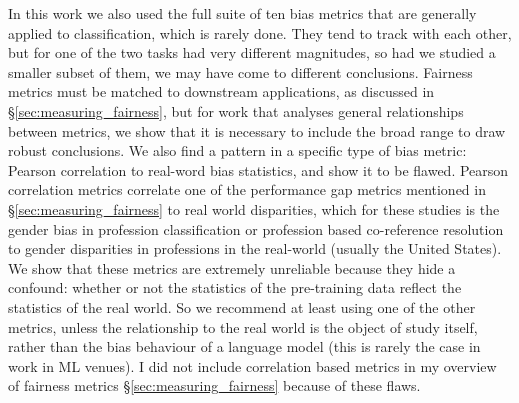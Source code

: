 In this work we also used the full suite of ten bias metrics that are generally applied to classification, which is rarely done. They tend to track with each other, but for one of the two tasks had very different magnitudes, so had we studied a smaller subset of them, we may have come to different conclusions. Fairness metrics must be matched to downstream applications, as discussed in \S \ref{sec:measuring_fairness}, but for work that analyses general relationships between metrics, we show that it is necessary to include the broad range to draw robust conclusions. 
We also find a pattern in a specific type of bias metric: Pearson correlation to real-word bias statistics, and show it to be flawed. Pearson correlation metrics correlate one of the performance gap metrics mentioned in \S \ref{sec:measuring_fairness} to real world disparities, which for these studies is the gender bias in profession classification or profession based co-reference resolution to gender disparities in professions in the real-world (usually the United States). We show that these metrics are extremely unreliable because they hide a confound: whether or not the statistics of the pre-training data reflect the statistics of the real world. So we recommend at least using one of the other metrics, unless the relationship to the real world is the object of study itself, rather than the bias behaviour of a language model (this is rarely the case in work in ML venues).  I did not include correlation based metrics in my overview of fairness metrics \S \ref{sec:measuring_fairness} because of these flaws. 

